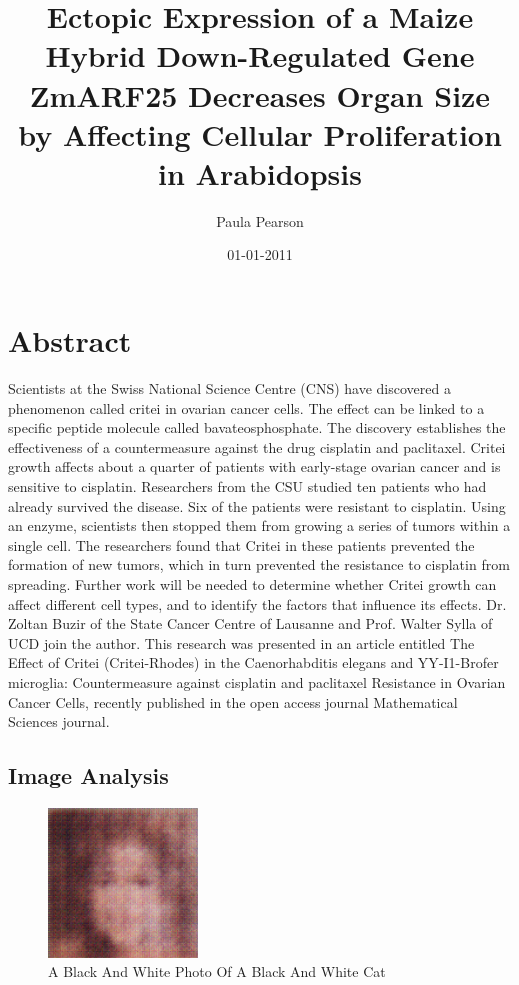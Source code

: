 \documentclass{article}%
\title{Ectopic Expression of a Maize Hybrid Down{-}Regulated Gene ZmARF25 Decreases Organ Size by Affecting Cellular Proliferation in Arabidopsis}%
\author{Paula Pearson}%
\affil{Nephrology Unit, Department of Medicine, Faculty of Medicine, Thammasat University (Rangsit Campus), Khlong Nueng, Khlong Luang, Pathum Thani 12121, Thailand}%
\date{01{-}01{-}2011}%
\begin{document}
%
\normalsize%
\maketitle%
\section{Abstract}%
\label{sec:Abstract}%
Scientists at the Swiss National Science Centre (CNS) have discovered a phenomenon called critei in ovarian cancer cells. The effect can be linked to a specific peptide molecule called bavateosphosphate. The discovery establishes the effectiveness of a countermeasure against the drug cisplatin and paclitaxel.\newline%
Critei growth affects about a quarter of patients with early{-}stage ovarian cancer and is sensitive to cisplatin. Researchers from the CSU studied ten patients who had already survived the disease. Six of the patients were resistant to cisplatin. Using an enzyme, scientists then stopped them from growing a series of tumors within a single cell. The researchers found that Critei in these patients prevented the formation of new tumors, which in turn prevented the resistance to cisplatin from spreading.\newline%
Further work will be needed to determine whether Critei growth can affect different cell types, and to identify the factors that influence its effects.\newline%
Dr. Zoltan Buzir of the State Cancer Centre of Lausanne and Prof. Walter Sylla of UCD join the author.\newline%
This research was presented in an article entitled The Effect of Critei (Critei{-}Rhodes) in the Caenorhabditis elegans and YY{-}I1{-}Brofer microglia: Countermeasure against cisplatin and paclitaxel Resistance in Ovarian Cancer Cells, recently published in the open access journal Mathematical Sciences journal.

%
\subsection{Image Analysis}%
\label{subsec:ImageAnalysis}%


\begin{figure}[h!]%
\centering%
\includegraphics[width=150px]{500_fake_images/samples_5_445.png}%
\caption{A Black And White Photo Of A Black And White Cat}%
\end{figure}

%
\end{document}
